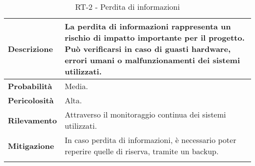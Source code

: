 \begin{longtable}{ | l | p{12cm} | }
	\hline
	\textbf{Descrizione}  & La perdita di informazioni rappresenta un rischio di impatto importante per il progetto. Può verificarsi in caso di guasti hardware, errori umani o malfunzionamenti dei sistemi utilizzati. \\
	\hline
	\textbf{Probabilità}  & Media.                                                                                                                                                                                       \\
	\hline
	\textbf{Pericolosità} & Alta.                                                                                                                                                                                        \\
	\hline
	\textbf{Rilevamento}  & Attraverso il monitoraggio continua dei sistemi utilizzati.                                                                                                                                  \\
	\hline
	\textbf{Mitigazione}  & In caso perdita di informazioni, è necessario poter reperire quelle di riserva, tramite un backup.                                                                                           \\
	\hline
	\caption{RT-2 - Perdita di informazioni}
\end{longtable}


